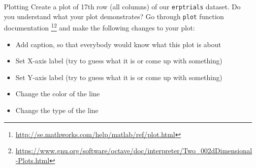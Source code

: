 \documentclass[a4paper,11pt]{article}
\begin{document}
%
%
\begin{exercise}{3}{Plotting}{}
Create a plot of 17th row (all columns) of our \texttt{erptrials} dataset. Do you understand what your plot demonstrates? Go through \texttt{plot} function documentation \footnote{\url{http://se.mathworks.com/help/matlab/ref/plot.html}}\footnote{\url{https://www.gnu.org/software/octave/doc/interpreter/Two_002dDimensional-Plots.html}} and make the following changes to your plot:
\begin{itemize}
    \item Add caption, so that everybody would know what this plot is about
    \item Set X-axis label (try to guess what it is or come up with something)
    \item Set Y-axis label (try to guess what it is or come up with something)
    \item Change the color of the line
    \item Change the type of the line
\end{itemize}
\end{exercise}
\end{document}
